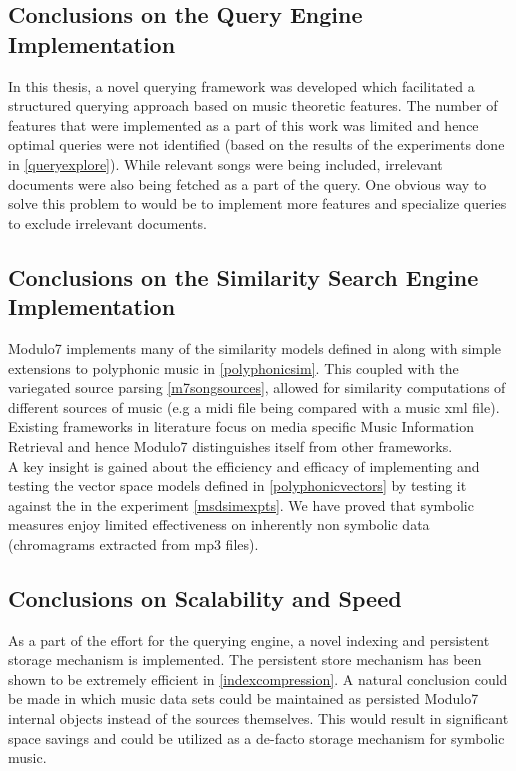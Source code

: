 \subsection{Conclusions on the Query Engine Implementation}

\noindent In this thesis, a novel querying framework was developed which facilitated a structured querying approach based on music theoretic features. The number of features that were implemented as a part of this work was limited and hence optimal queries were not identified (based on the results of the experiments done in \ref{queryexplore}). While relevant songs were being included, irrelevant documents were also being fetched as a part of the query. One obvious way to solve this problem to would be to implement more features and specialize queries to exclude irrelevant documents. \\


\subsection{Conclusions on the Similarity Search Engine Implementation}

\noindent Modulo7 implements many of the similarity models defined in \cite{similietechnicalmanual} along with simple extensions to polyphonic music in \ref{polyphonicsim}. This coupled with the variegated source parsing \ref{m7songsources}, allowed for similarity computations of different sources of music (e.g a midi file being compared with a music xml file). Existing frameworks in literature \cite{jMIR, marsyas, similie, humdrum}  focus on media specific Music Information Retrieval and hence Modulo7 distinguishes itself from other frameworks. \\

\noindent A key insight is gained about the efficiency and efficacy of  implementing and testing the vector space models defined in  \ref{polyphonicvectors} by testing it against the \cite{msd} in the experiment \ref{msdsimexpts}. We have proved that symbolic measures enjoy limited effectiveness on inherently non symbolic data (chromagrams extracted from mp3 files). 

\subsection{Conclusions on Scalability and Speed}

\noindent As a part of the effort for the querying engine, a novel indexing and persistent storage mechanism is implemented. The persistent store mechanism has been shown to be extremely efficient in \ref{indexcompression}. A natural conclusion could be made in which music data sets could be maintained as persisted Modulo7 internal objects instead of the sources themselves. This would result in significant space savings and could be utilized as a de-facto storage mechanism for symbolic music. \\

